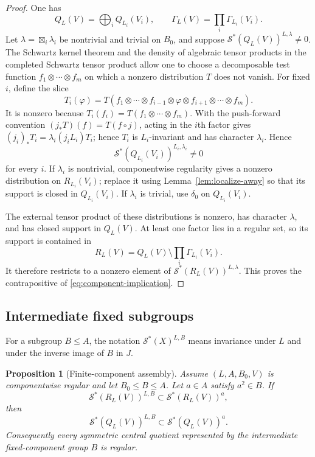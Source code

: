 \documentclass[10pt,a4paper]{amsart}
\numberwithin{equation}{section}
\newtheorem{proposition}[theorem]{Proposition}
\newcommand{\cS}{\mathcal S}
\begin{document}
\begin{proof}
One has
\[
 Q_L(V)=\bigoplus_iQ_{L_i}(V_i),
 \qquad
 \Gamma_L(V)=\prod_i\Gamma_{L_i}(V_i).
\]
Let $\lambda=\boxtimes_i\lambda_i$ be nontrivial and trivial on $B_0$, and
suppose $\cS^*(Q_L(V))^{L,\lambda}\ne0$.  The Schwartz kernel theorem and the
density of algebraic tensor products in the completed Schwartz tensor product
\cite{AGSchwartz} allow one to choose a decomposable test function
$f_1\otimes\cdots\otimes f_m$ on which a nonzero distribution $T$ does not
vanish.  For fixed $i$, define the slice
\[
 T_i(\varphi)=T(f_1\otimes\cdots\otimes f_{i-1}\otimes\varphi
                  \otimes f_{i+1}\otimes\cdots\otimes f_m).
\]
It is nonzero because $T_i(f_i)=T(f_1\otimes\cdots\otimes f_m)$.  With the push-forward convention
$(j_*T)(f)=T(f\circ j)$, acting in the $i$th factor gives
$(j_i)_*T_i=\lambda_i(j_iL_i)T_i$; hence $T_i$ is $L_i$-invariant and has
character $\lambda_i$.  Hence
\[
 \cS^*(Q_{L_i}(V_i))^{L_i,\lambda_i}\ne0
\]
for every $i$.  If $\lambda_i$ is nontrivial, componentwise regularity gives a
nonzero distribution on $R_{L_i}(V_i)$; replace it using
Lemma~\ref{lem:localize-away} so that its support is closed in
$Q_{L_i}(V_i)$.  If $\lambda_i$ is trivial, use $\delta_0$ on
$Q_{L_i}(V_i)$.

The external tensor product of these distributions is nonzero, has character
$\lambda$, and has closed support in $Q_L(V)$.  At least one factor lies in a
regular set, so its support is contained in
\[
 R_L(V)=Q_L(V)\setminus\prod_i\Gamma_{L_i}(V_i).
\]
It therefore restricts to a nonzero element of
$\cS^*(R_L(V))^{L,\lambda}$.  This proves the contrapositive of
\eqref{eq:component-implication}.
\end{proof}

\subsection{Intermediate fixed subgroups}

For a subgroup $B\leq A$, the notation $\cS^*(X)^{L,B}$ means invariance under
$L$ and under the inverse image of $B$ in $J$.

\begin{proposition}[Finite-component assembly]\label{prop:finite-assembly}
Assume $(L,A,B_0,V)$ is componentwise regular and let
$B_0\leq B\leq A$.  Let $a\in A$ satisfy $a^2\in B$.  If
\[
 \cS^*(R_L(V))^{L,B}\subset\cS^*(R_L(V))^a,
\]
then
\[
 \cS^*(Q_L(V))^{L,B}\subset\cS^*(Q_L(V))^a.
\]
Consequently every symmetric central quotient represented by the intermediate
fixed-component group $B$ is regular.
\end{proposition}
\end{document}
